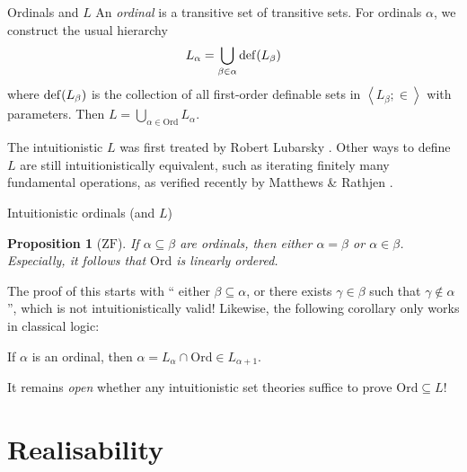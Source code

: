 \documentclass{beamer}
\newtheorem{proposition}{Proposition}
\theoremstyle{definition}
\newcommand{\tuple}[1]{\left\langle #1 \right\rangle}
\newcommand{\Ord}{\mathrm{Ord}}
\begin{document}
\begin{frame}{Ordinals and $L$}
  An \emph{ordinal} is a transitive set of transitive sets. For ordinals $\alpha$, we construct the usual hierarchy
  \[L_\alpha = \bigcup_{\beta \in \alpha} \mathrm{def}\mleft(L_\beta\mright)\]
  where $\mathrm{def}\mleft(L_\beta\mright)$ is the collection of all first-order definable sets in $\tuple{L_\beta; \in}$ with parameters. Then $L = \bigcup_{\alpha \in \Ord} L_\alpha$.

  \vspace{1em}
  The intuitionistic $L$ was first treated by Robert Lubarsky \cite{lubarsky93-intuitionistic-l}. Other ways to define $L$ are still intuitionistically equivalent, such as iterating finitely many fundamental operations, as verified recently by Matthews \& Rathjen \cite{matthews-rathjen24-constructible-universe}.
\end{frame}

\begin{frame}{Intuitionistic ordinals (and $L$)}
  \begin{proposition}[$\mathrm{ZF}$]
    If $\alpha \subseteq \beta$ are ordinals, then either $\alpha = \beta$ or $\alpha \in \beta$. Especially, it follows that $\Ord$ is linearly ordered.
  \end{proposition}

  \vspace{0.6em}
  The proof of this starts with ``{ either $\beta \subseteq \alpha$, or there exists $\gamma \in \beta$ such that $\gamma \not\in \alpha$\textellipsis}'', which is not intuitionistically valid! \pause Likewise, the following corollary only works in classical logic:

  \vspace{0.4em}
  \begin{corollary}[$\mathrm{ZF}$]
    If $\alpha$ is an ordinal, then $\alpha = L_\alpha \cap \Ord \in L_{\alpha + 1}$.
  \end{corollary}

  \vspace{0.6em}
  It remains \emph{open} whether any intuitionistic set theories suffice to prove $\Ord \subseteq L$!
\end{frame}

\section{Realisability}
\end{document}
